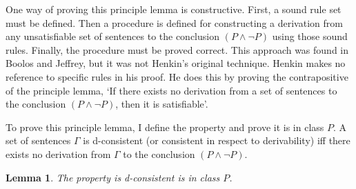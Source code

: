 \documentclass[12pt]{article}
\newtheorem{lemma}[theorem]{Lemma}
\theoremstyle{definition}
\theoremstyle{remark}
\begin{document}
One way of proving this principle lemma is constructive. First, a sound rule set must be defined. Then a procedure is defined for constructing a derivation from any unsatisfiable set of sentences to the conclusion $(P \land \neg P)$ using those sound rules. Finally, the procedure must be proved correct. This approach was found in Boolos and Jeffrey\cite{boolosjeffrey}, but it was not Henkin's original technique. Henkin makes no reference to specific rules in his proof. He does this by proving the contrapositive of the principle lemma, `If there exists no derivation from a set of sentences to the conclusion $(P \land \neg P)$, then it is satisfiable'. 

To prove this principle lemma, I define the property  and prove it is in class $P$. A set of sentences $\Gamma$ is d-consistent (or consistent in respect to derivability) iff there exists no derivation from $\Gamma$ to the conclusion $(P \land \neg P)$. 

\begin{lemma}
	\label{lem:d-consistent_is_p}
	The property is d-consistent is in class $P$.
\end{lemma}
\end{document}
